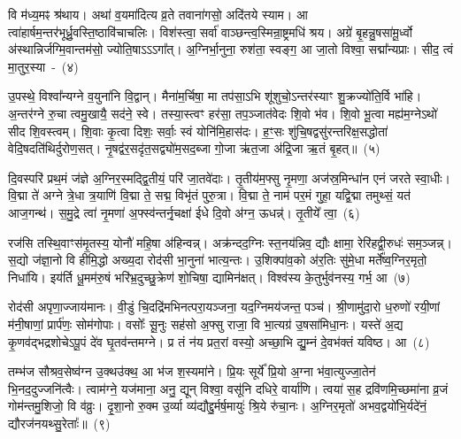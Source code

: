 वि म॑ध्य॒मꣴ श्र॑थाय। अथा॑ व॒यमा॑दित्य व्र॒ते तवाना॑गसो॒ अदि॑तये स्याम। आ त्वा॑हार्\mbox{}षम॒न्तर॑भूर्ध्रु॒वस्ति॒ष्ठा\-वि॑चाचलिः। विश॑स्त्वा॒ सर्वा॑ वाञ्छन्त्व॒स्मिन्रा॒ष्ट्रमधि॑ श्रय। अग्रे॑ बृ॒हन्नु॒षसा॑मू॒र्ध्वो अ॑स्थान्निर्जग्मि॒वान्तम॑सो॒ ज्योति॒षा\-ऽऽ\-ऽ\-गा᳚त्। अ॒ग्निर्भा॒नुना॒ रुश॑ता॒ स्वङ्ग॒ आ जा॒तो विश्वा॒ सद्मा᳚न्यप्राः। सीद॒ त्वं मा॒तुर॒स्या~-~(४)

उ॒पस्थे॒ विश्वा᳚न्यग्ने व॒युना॑नि वि॒द्वान्। मैना॑म॒र्चिषा॒ मा तप॑सा॒\-ऽभि शू॑शुचो॒\-ऽन्तर॑स्याꣳ शु॒क्रज्यो॑ति॒र्वि भा॑हि। अ॒न्तर॑ग्ने रु॒चा त्वमु॒खायै॒ सद॑ने॒ स्वे। तस्या॒स्त्वꣳ हर॑सा॒ तप॒ञ्जात॑वेदः शि॒वो भ॑व। शि॒वो भू॒त्वा मह्य॑म॒ग्ने\-ऽथो॑ सीद शि॒वस्त्वम्। शि॒वाः कृ॒त्वा दिशः॒ सर्वाः॒ स्वं योनि॑मि॒हास॑दः। ह॒ꣳ॒सः शु॑चि॒षद्वसु॑रन्तरिक्ष॒सद्धोता॑ वेदि॒षदति॑थिर्दुरोण॒सत्। नृ॒षद्व॑र॒सदृ॑त॒सद्व्यो॑म॒सद॒ब्जा गो॒जा ऋ॑त॒जा अ॑द्रि॒जा ऋ॒तं बृ॒हत्॥~(५)

{\anuvakamend[{दिव॒मनु॒ वि क्र॑मस्व॒ निर्भ॑क्तः॒ स यं द्वि॒ष्मो विष्णो॒र्धने॒नाग्ने॑\-ऽध॒मम॒स्याः शु॑चि॒षथ्षोड॑श च}]}%

दि॒वस्परि॑ प्रथ॒मं ज॑ज्ञे अ॒ग्निर॒स्मद्द्वि॒तीयं॒ परि॑ जा॒तवे॑दाः। तृ॒तीय॑म॒फ्सु नृ॒मणा॒ अज॑स्र॒मिन्धा॑न एनं जरते स्वा॒धीः। वि॒द्मा ते॑ अग्ने त्रे॒धा त्र॒याणि॑ वि॒द्मा ते॒ सद्म॒ विभृ॑तं पुरु॒त्रा। वि॒द्मा ते॒ नाम॑ पर॒मं गुहा॒ यद्वि॒द्मा तमुथ्सं॒ यत॑ आज॒गन्थ॑। स॒मु॒द्रे त्वा॑ नृ॒मणा॑ अ॒फ्स्व॑न्तर्नृ॒चक्षा॑ ईधे दि॒वो अ॑ग्न॒ ऊधन्न्॑। तृ॒तीये᳚ त्वा॒~(६)

रज॑सि तस्थि॒वाꣳस॑मृ॒तस्य॒ योनौ॑ महि॒षा अ॑हिन्वन्न्। अक्र॑न्दद॒ग्निः स्त॒नय॑न्निव॒ द्यौः क्षामा॒ रेरि॑हद्वी॒रुधः॑ सम॒ञ्जन्न्। स॒द्यो ज॑ज्ञा॒नो वि हीमि॒द्धो अख्य॒दा रोद॑सी भा॒नुना॑ भात्य॒न्तः। उ॒शिक्पा॑व॒को अ॑र॒तिः सु॑मे॒धा मर्ते᳚ष्व॒ग्निर॒मृतो॒ निधा॑यि। इय॑र्ति धू॒मम॑रु॒षं भरि॑भ्र॒दुच्छु॒क्रेण॑ शो॒चिषा॒ द्यामिन॑क्षत्। विश्व॑स्य के॒तुर्भुव॑नस्य॒ गर्भ॒ आ~(७)

रोद॑सी अपृणा॒ज्जाय॑मानः। वी॒डुं चि॒दद्रि॑मभिनत्परा॒यञ्जना॒ यद॒ग्निमय॑जन्त॒ पञ्च॑। श्री॒णामु॑दा॒रो ध॒रुणो॑ रयी॒णां म॑नी॒षाणां॒ प्रार्प॑णः॒ सोम॑गोपाः। वसोः᳚ सू॒नुः सह॑सो अ॒फ्सु राजा॒ वि भा॒त्यग्र॑ उ॒षसा॑मिधा॒नः। यस्ते॑ अ॒द्य कृ॒णव॑द्भद्रशोचे\-ऽपू॒पं दे॑व घृ॒तव॑न्तमग्ने। प्र तं न॑य प्रत॒रां वस्यो॒ अच्छा॒भि द्यु॒म्नं दे॒वभ॑क्तं यविष्ठ। आ~(८)

तम्भ॑ज सौश्रव॒सेष्व॑ग्न उ॒क्थउ॑क्थ॒ आ भ॑ज श॒स्यमा॑ने। प्रि॒यः सूर्ये᳚ प्रि॒यो अ॒ग्ना भ॑वा॒त्युज्जा॒तेन॑ भि॒नद॒दुज्जनि॑त्वैः। त्वाम॑ग्ने॒ यज॑माना॒ अनु॒ द्यून् विश्वा॒ वसू॑नि दधिरे॒ वार्या॑णि। त्वया॑ स॒ह द्रवि॑णमि॒च्छमा॑ना व्र॒जं गोम॑न्तमु॒शिजो॒ वि व॑व्रुः। दृ॒शा॒नो रु॒क्म उ॒र्व्या व्य॑द्यौद्दु॒र्मर्\mbox{}ष॒मायुः॑ श्रि॒ये रु॑चा॒नः। अ॒ग्निर॒मृतो॑ अभव॒द्वयो॑भि॒र्यदे॑नं॒ द्यौरज॑नयथ्सु॒रेताः᳚॥~(९)

